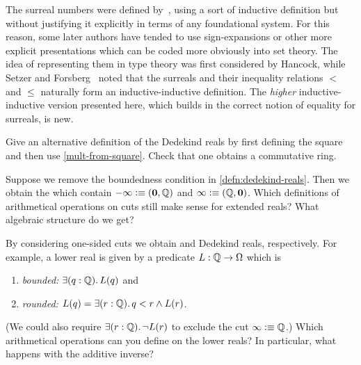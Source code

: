 The surreal numbers were defined by~\cite{conway:onag}, using a sort of inductive definition but without justifying it explicitly in terms of any foundational system.
For this reason, some later authors have tended to use sign-expansions or other more explicit presentations which can be coded more obviously into set theory.
The idea of representing them in type theory was first considered by Hancock, while
Setzer and Forsberg~\cite{forsbergfinite} noted that the surreals and their inequality relations $<$ and $\le$ naturally form an inductive-inductive definition.
The \emph{higher} inductive-inductive version presented here, which builds in the correct notion of equality for surreals, is new.


\sectionExercises

\begin{ex}
 Give an alternative definition of the Dedekind reals by first defining the square and then use \autoref{mult-from-square}.
 Check that one obtains a commutative ring.
\end{ex}

\begin{ex} \label{ex:RD-extended-reals}
  Suppose we remove the boundedness condition in \autoref{defn:dedekind-reals}.
  Then we obtain the 
  which contain $-\infty \vcentcolon\equiv
  (\mathbf{0}, \mathbb{Q})$ and $\infty \vcentcolon\equiv (\mathbb{Q}, \mathbf{0})$. Which definitions of arithmetical
  operations on cuts still make sense for extended reals? What algebraic structure do we
  get?
\end{ex}

\begin{ex} \label{ex:RD-lower-cuts}
  By considering one-sided cuts we obtain  and  Dedekind reals,
  respectively. For example, a lower real is given by a predicate $L : \mathbb{Q} \to \Omega$
  which is
  \begin{enumerate}
  \item \emph{bounded:} $\exis{q : \Q} L(q)$ and
  \item \emph{rounded:} $L(q) = \exis{r : \Q} q < r \land L(r)$.
  \end{enumerate}
  (We could also require $\exis{r : \Q} \lnot L(r)$ to exclude the cut $\infty \vcentcolon\equiv
  \mathbb{Q}$.) Which arithmetical operations can you define on the lower reals? In particular,
  what happens with the additive inverse?
\end{ex}

